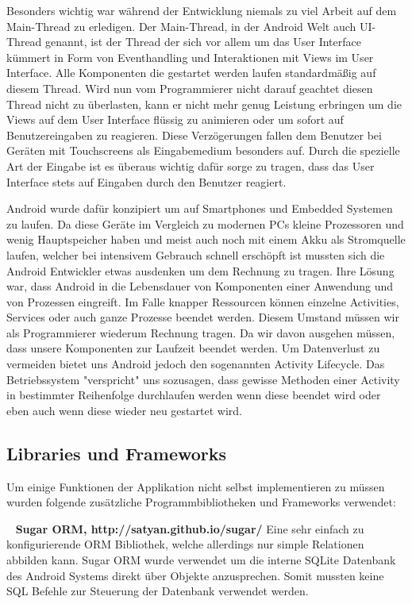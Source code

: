 \documentclass{scrartcl}
\begin{document}
Besonders wichtig war während der Entwicklung niemals zu viel Arbeit auf dem Main-Thread zu erledigen. Der Main-Thread, in der Android Welt auch UI-Thread genannt, ist der Thread der sich vor allem um das User Interface kümmert in Form von Eventhandling und Interaktionen mit Views im User Interface. Alle Komponenten die gestartet werden laufen standardmäßig auf diesem Thread. Wird nun vom Programmierer nicht darauf geachtet diesen Thread nicht zu überlasten, kann er nicht mehr genug Leistung erbringen um die Views auf dem User Interface flüssig zu animieren oder um sofort auf Benutzereingaben zu reagieren. Diese Verzögerungen fallen dem Benutzer bei Geräten mit Touchscreens als Eingabemedium besonders auf. Durch die spezielle Art der Eingabe ist es überaus wichtig dafür sorge zu tragen, dass das User Interface stets auf Eingaben durch den Benutzer reagiert. 

Android wurde dafür konzipiert um auf Smartphones und Embedded Systemen zu laufen. Da diese Geräte im Vergleich zu modernen PCs kleine Prozessoren und wenig Hauptspeicher haben und meist auch noch mit einem Akku als Stromquelle laufen, welcher bei intensivem Gebrauch schnell erschöpft ist mussten sich die Android Entwickler etwas ausdenken um dem Rechnung zu tragen.
Ihre Lösung war, dass Android in die Lebensdauer von Komponenten einer Anwendung und von Prozessen eingreift. Im Falle knapper Ressourcen können einzelne Activities, Services oder auch ganze Prozesse beendet werden. Diesem Umstand müssen wir als Programmierer wiederum Rechnung tragen. Da wir davon ausgehen müssen, dass unsere Komponenten zur Laufzeit beendet werden. Um Datenverlust zu vermeiden bietet uns Android jedoch den sogenannten Activity Lifecycle. Das Betriebssystem "verspricht" uns sozusagen, dass gewisse Methoden einer Activity in bestimmter Reihenfolge durchlaufen werden wenn diese beendet wird oder eben auch wenn diese wieder neu gestartet wird. 

\subsection{Libraries und Frameworks}
Um einige Funktionen der Applikation nicht selbst implementieren zu müssen
wurden folgende zusätzliche Programmbibliotheken und Frameworks verwendet:

\noindent
\ \newline
\textbf{Sugar ORM, http://satyan.github.io/sugar/} \newline
Eine sehr einfach zu konfigurierende ORM Bibliothek, welche allerdings nur
simple Relationen abbilden kann. Sugar ORM wurde verwendet um die interne SQLite
Datenbank des Android Systems direkt über Objekte anzusprechen. Somit mussten
keine SQL Befehle zur Steuerung der Datenbank verwendet werden.
\end{document}
